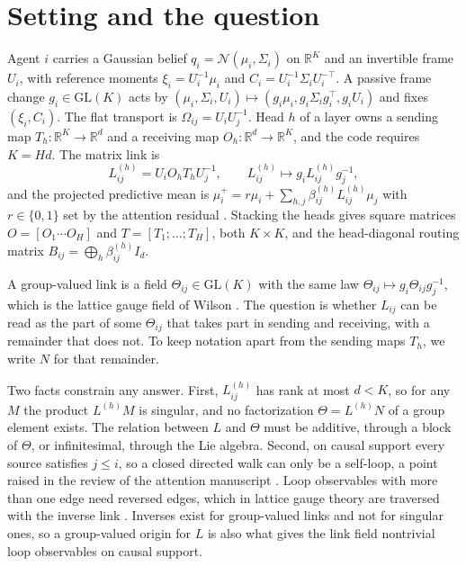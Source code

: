 \documentclass[11pt]{article}
\theoremstyle{definition}
\theoremstyle{remark}
\newcommand{\GL}{\mathrm{GL}}
\begin{document}
\section{Setting and the question}
\label{sec:setting}

Agent $i$ carries a Gaussian belief $q_i=\mathcal N(\mu_i,\Sigma_i)$ on $\mathbb R^K$ and an invertible frame $U_i$, with reference moments $\xi_i=U_i^{-1}\mu_i$ and $C_i=U_i^{-1}\Sigma_iU_i^{-\top}$. A passive frame change $g_i\in\GL(K)$ acts by $(\mu_i,\Sigma_i,U_i)\mapsto(g_i\mu_i,g_i\Sigma_ig_i^\top,g_iU_i)$ and fixes $(\xi_i,C_i)$. The flat transport is $\Omega_{ij}=U_iU_j^{-1}$. Head $h$ of a layer owns a sending map $T_h:\mathbb R^K\to\mathbb R^d$ and a receiving map $O_h:\mathbb R^d\to\mathbb R^K$, and the code requires $K=Hd$. The matrix link is
\begin{equation}
L_{ij}^{(h)}=U_iO_hT_hU_j^{-1},\qquad L_{ij}^{(h)}\mapsto g_iL_{ij}^{(h)}g_j^{-1},
\label{eq:link}
\end{equation}
and the projected predictive mean is $\mu_i^+=r\mu_i+\sum_{h,j}\beta_{ij}^{(h)}L_{ij}^{(h)}\mu_j$ with $r\in\{0,1\}$ set by the attention residual \cite{dennis2026projpred}. Stacking the heads gives square matrices $O=[O_1\cdots O_H]$ and $T=[T_1;\dots;T_H]$, both $K\times K$, and the head-diagonal routing matrix $B_{ij}=\bigoplus_h\beta_{ij}^{(h)}I_d$.

A group-valued link is a field $\Theta_{ij}\in\GL(K)$ with the same law $\Theta_{ij}\mapsto g_i\Theta_{ij}g_j^{-1}$, which is the lattice gauge field of Wilson \cite{wilson1974}. The question is whether $L_{ij}$ can be read as the part of some $\Theta_{ij}$ that takes part in sending and receiving, with a remainder that does not. To keep notation apart from the sending maps $T_h$, we write $N$ for that remainder.

Two facts constrain any answer. First, $L_{ij}^{(h)}$ has rank at most $d<K$, so for any $M$ the product $L^{(h)}M$ is singular, and no factorization $\Theta=L^{(h)}N$ of a group element exists. The relation between $L$ and $\Theta$ must be additive, through a block of $\Theta$, or infinitesimal, through the Lie algebra. Second, on causal support every source satisfies $j\le i$, so a closed directed walk can only be a self-loop, a point raised in the review of the attention manuscript \cite{glkreview2026}. Loop observables with more than one edge need reversed edges, which in lattice gauge theory are traversed with the inverse link \cite{wilson1974,kogut1979}. Inverses exist for group-valued links and not for singular ones, so a group-valued origin for $L$ is also what gives the link field nontrivial loop observables on causal support.
\end{document}

